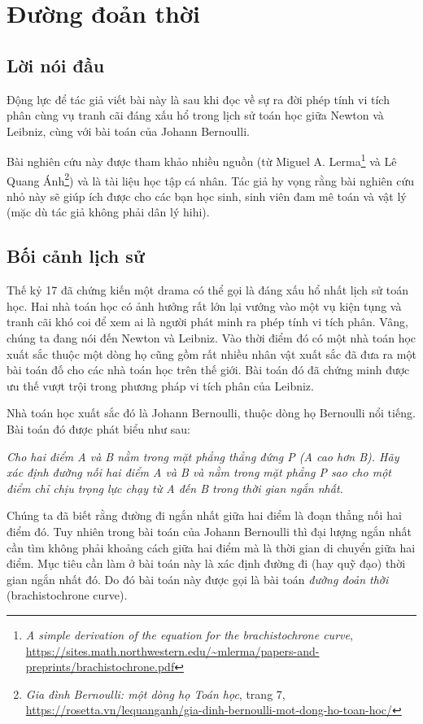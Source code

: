 \chapter{Đường đoản thời}

\section*{Lời nói đầu}

Động lực để tác giả viết bài này là sau khi đọc về sự ra đời phép tính vi tích phân cùng vụ tranh cãi đáng xấu hổ trong lịch sử toán học giữa Newton và Leibniz, cùng với bài toán của Johann Bernoulli. 
        
Bài nghiên cứu này được tham khảo nhiều nguồn (từ Miguel A. Lerma\footnote{\emph{A simple derivation of the equation for the brachistochrone curve}, \url{https://sites.math.northwestern.edu/~mlerma/papers-and-preprints/brachistochrone.pdf}} và Lê Quang Ánh\footnote{\emph{Gia đình Bernoulli: một dòng họ Toán học}, trang 7, \url{https://rosetta.vn/lequanganh/gia-dinh-bernoulli-mot-dong-ho-toan-hoc/}}) và là tài liệu học tập cá nhân. Tác giả hy vọng rằng bài nghiên cứu nhỏ này sẽ giúp ích được cho các bạn học sinh, sinh viên đam mê toán và vật lý (mặc dù tác giả không phải dân lý hihi).

\section*{Bối cảnh lịch sử}

Thế kỷ 17 đã chứng kiến một drama có thể gọi là đáng xấu hổ nhất lịch sử toán học. Hai nhà toán học có ảnh hưởng rất lớn lại vướng vào một vụ kiện tụng và tranh cãi khó coi để xem ai là người phát minh ra phép tính vi tích phân. Vâng, chúng ta đang nói đến Newton và Leibniz. Vào thời điểm đó có một nhà toán học xuất sắc thuộc một dòng họ cũng gồm rất nhiều nhân vật xuất sắc đã đưa ra một bài toán đố cho các nhà toán học trên thế giới. Bài toán đó đã chứng minh được ưu thế vượt trội trong phương pháp vi tích phân của Leibniz.
    
Nhà toán học xuất sắc đó là Johann Bernoulli, thuộc dòng họ Bernoulli nổi tiếng. Bài toán đó được phát biểu như sau:
    
\textit{Cho hai điểm A và B nằm trong mặt phẳng thẳng đứng P (A cao hơn B). Hãy 
    xác định đường nối hai điểm A và B và nằm trong mặt phẳng P sao cho một 
    điểm chỉ chịu trọng lực chạy từ A đến B trong thời gian ngắn nhất.}

Chúng ta đã biết rằng đường đi ngắn nhất giữa hai điểm là đoạn thẳng nối hai điểm đó. Tuy nhiên trong bài toán của Johann Bernoulli thì đại lượng ngắn nhất cần tìm không phải khoảng cách giữa hai điểm mà là thời gian di chuyển giữa hai điểm. Mục tiêu cần làm ở bài toán này là xác định đường đi (hay quỹ đạo) thời gian ngắn nhất đó. Do đó bài toán này được gọi là bài toán \textit{đường đoản thời} (brachistochrone curve).

